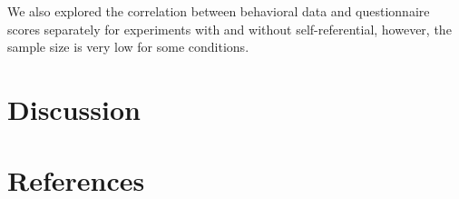 \documentclass[
  english,
  man]{apa6}
\begin{document}
We also explored the correlation between behavioral data and questionnaire scores separately for experiments with and without self-referential, however, the sample size is very low for some conditions.

\hypertarget{discussion}{%
\section{Discussion}\label{discussion}}

\hypertarget{references}{%
\section{References}\label{references}}

\begingroup
\setlength{\parindent}{-0.5in}
\setlength{\leftskip}{0.5in}
\end{document}
